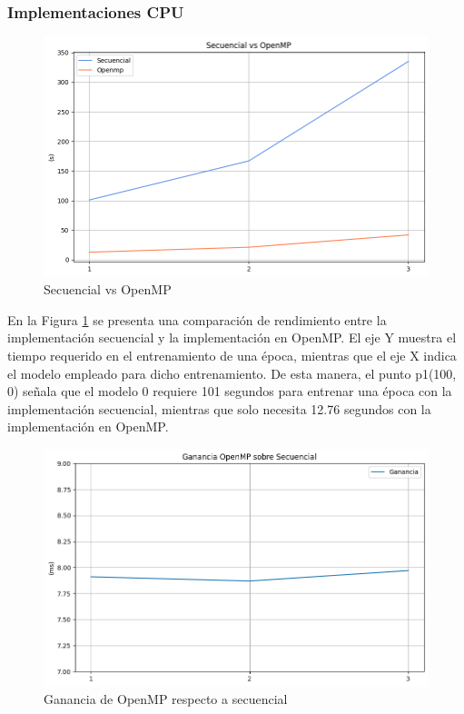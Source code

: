 \subsubsection{Implementaciones CPU}

\begin{figure}[H]
	\centering
	\includegraphics[scale=0.5]{imagenes/sec_openmp.png}  
	\caption{Secuencial vs OpenMP}
	\label{fig:sec_openmp}
\end{figure}

En la Figura \ref{fig:sec_openmp} se presenta una comparación de rendimiento entre la implementación secuencial y la implementación en OpenMP. El eje Y muestra el tiempo requerido en el entrenamiento de una época, mientras que el eje X indica el modelo empleado para dicho entrenamiento. De esta manera, el punto p1(100, 0) señala que el modelo 0 requiere 101 segundos para entrenar una época con la implementación secuencial, mientras que solo necesita 12.76 segundos con la implementación en OpenMP.

\begin{figure}[H]
	\centering
	\includegraphics[scale=0.5]{imagenes/ganancia_sec_openmp.png}  
	\caption{Ganancia de OpenMP respecto a secuencial}
	\label{fig:ganancia_sec_openmp}
\end{figure}

